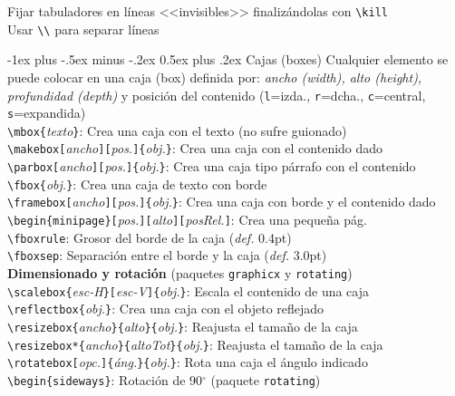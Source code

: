 \documentclass[10pt,landscape,a4paper]{article}
\makeatletter
\renewcommand{\section}{\@startsection{section}{1}{0mm}%
                                {-1ex plus -.5ex minus -.2ex}%
                                {0.5ex plus .2ex}%
                                {\normalfont\large\bfseries}}
\makeatother
\begin{document}
\begin{multicols}{3}
Fijar tabuladores en líneas <<invisibles>> finalizándolas con \verb!\kill!\\
Usar \verb!\\! para separar líneas






\section{Cajas (boxes)}
 Cualquier elemento se puede colocar en una caja (box) definida por: \emph{ancho (width), alto (height), profundidad (depth)} y posición del contenido (\texttt{l}=izda., \texttt{r}=dcha., \texttt{c}=central, \texttt{s}=expandida)\\[0.7mm]
 
\verb!\mbox{!\emph{texto}\verb!}!: Crea una caja con el texto (no sufre guionado)\\
\verb!\makebox[!\emph{ancho}\verb!][!\emph{pos.}\verb!]{!\emph{obj.}\verb!}!: Crea una caja con el contenido dado\\
\verb!\parbox[!\emph{ancho}\verb!][!\emph{pos.}\verb!]{!\emph{obj.}\verb!}!: Crea una caja tipo párrafo con el contenido\\
\verb!\fbox{!\emph{obj.}\verb!}!: Crea una caja de texto con borde\\
\verb!\framebox[!\emph{ancho}\verb!][!\emph{pos.}\verb!]{!\emph{obj.}\verb!}!: Crea una caja con borde y el contenido dado\\
\verb!\begin{minipage}[!\emph{pos.}\verb!][!\emph{alto}\verb!][!\emph{posRel.}\verb!]!: Crea una pequeña pág.\\
\verb!\fboxrule!: Grosor del borde de la caja (\emph{def.} 0.4pt)\\
\verb!\fboxsep!: Separación entre el borde y la caja (\emph{def.} 3.0pt)\\[0.7mm]




\textbf{Dimensionado y rotación} {\small (paquetes \texttt{graphicx} y \texttt{rotating})}\\
\verb!\scalebox{!\emph{esc-H}\verb!}[!\emph{esc-V}\verb!]{!\emph{obj.}\verb!}!: Escala el contenido de una caja\\
\verb!\reflectbox{!\emph{obj.}\verb!}!: Crea una caja con el objeto reflejado\\
\verb!\resizebox{!\emph{ancho}\verb!}{!\emph{alto}\verb!}{!\emph{obj.}\verb!}!: Reajusta el tamaño de la caja\\
\verb!\resizebox*{!\emph{ancho}\verb!}{!\emph{altoTot}\verb!}{!\emph{obj.}\verb!}!: Reajusta el tamaño de la caja\\
\verb!\rotatebox[!\emph{opc.}\verb!]{!\emph{áng.}\verb!}{!\emph{obj.}\verb!}!: Rota una caja el ángulo indicado\\
\verb!\begin{sideways}!: Rotación de 90$^\circ$ (paquete \texttt{rotating})\\






\end{multicols}
\end{document}
